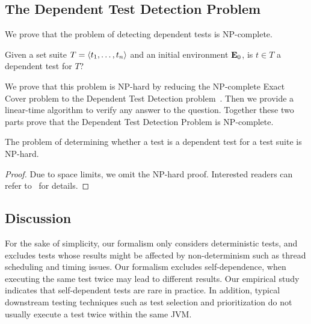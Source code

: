 \subsection{The Dependent Test Detection Problem}

We prove that the problem of detecting dependent tests
 is NP-complete.


\begin{definition}
Given a set suite\/ $T =  \langle t_1, \dots, t_n \rangle $ and an initial environment\/
$\mathbf{E}_0$, is $t \in T$ a dependent test for $T$?
\end{definition}

We prove that this problem is NP-hard by reducing the NP-complete Exact Cover problem
to the Dependent Test Detection
problem~\cite{karp:NP:1972}. 
Then we provide a linear-time algorithm to verify any answer to the
question.
Together these two parts prove that the Dependent Test Detection Problem is NP-complete.

\begin{theorem}
The problem of determining whether a test is a dependent test for
a test suite is NP-hard.
\end{theorem}

\begin{proof}
Due to space limits, we omit the NP-hard proof. Interested
readers can refer to~\cite{testdependence} for details.
\end{proof}

%

\subsection{Discussion}
\label{sec:formaldiscussion}

For the sake of simplicity, our formalism only
considers deterministic tests,
and excludes tests whose results might be affected by
non-determinism such as thread scheduling
and timing issues.
Our formalism excludes self-dependence, 
when executing the same test twice
may lead to different results. Our empirical study
indicates that self-dependent tests
are rare in practice. In addition, typical
downstream testing techniques such as test selection and
prioritization do not usually execute a test twice within the same JVM.



